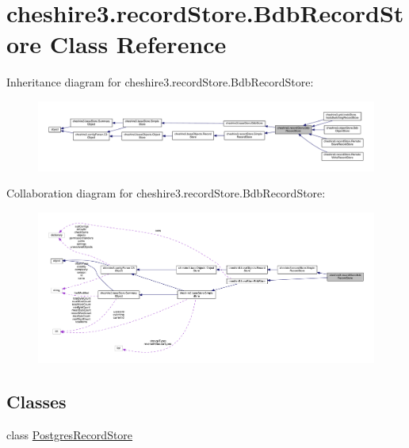 \hypertarget{classcheshire3_1_1record_store_1_1_bdb_record_store}{\section{cheshire3.\-record\-Store.\-Bdb\-Record\-Store Class Reference}
\label{classcheshire3_1_1record_store_1_1_bdb_record_store}
}


Inheritance diagram for cheshire3.\-record\-Store.\-Bdb\-Record\-Store\-:
\nopagebreak
\begin{figure}[H]
\begin{center}
\leavevmode
\includegraphics[width=350pt]{classcheshire3_1_1record_store_1_1_bdb_record_store__inherit__graph}
\end{center}
\end{figure}


Collaboration diagram for cheshire3.\-record\-Store.\-Bdb\-Record\-Store\-:
\nopagebreak
\begin{figure}[H]
\begin{center}
\leavevmode
\includegraphics[width=350pt]{classcheshire3_1_1record_store_1_1_bdb_record_store__coll__graph}
\end{center}
\end{figure}
\subsection*{Classes}
\begin{DoxyCompactItemize}
\item 
class \hyperlink{classcheshire3_1_1record_store_1_1_bdb_record_store_1_1_postgres_record_store}{Postgres\-Record\-Store}
\end{DoxyCompactItemize}
